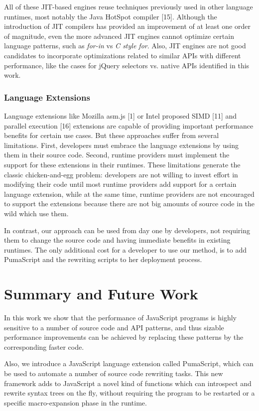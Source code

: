 \documentclass[preprint,10pt]{sigplanconf}
\begin{document}
All of these JIT-based engines reuse techniques previously used in other language runtimes, most notably the Java HotSpot compiler [15]. Although the introduction of JIT compilers has provided an improvement of at least one order of magnitude, even the more advanced JIT engines cannot optimize certain language patterns, such as \emph{for-in} vs \emph{C style for}. Also, JIT engines are not good candidates to incorporate optimizations related to similar APIs with different performance, like the cases for jQuery selectors vs. native APIs identified in this work.

\subsubsection{Language Extensions}

Language extensions like Mozilla asm.js [1] or Intel proposed SIMD [11] and parallel execution [16] extensions are capable of providing important performance benefits for certain use cases. But these approaches suffer from several limitations. First, developers must embrace the language extensions by using them in their source code. Second, runtime providers must implement the support for these extensions in their runtimes. These limitations generate the classic chicken-and-egg problem: developers are not willing to invest effort in modifying their code until most runtime providers add support for a certain language extension, while at the same time, runtime providers are not encouraged to support the extensions because there are not big amounts of source code in the wild which use them.

In contrast, our approach can be used from day one by developers, not requiring them to change the source code and having immediate benefits in existing runtimes. The only additional cost for a developer to use our method, is to add PumaScript and the rewriting scripts to her deployment process.

\section{Summary and Future Work}
In this work we show that the performance of JavaScript programs is highly sensitive to a number of source code and API patterns, and thus sizable performance improvements can be achieved by replacing these patterns by the corresponding faster code.

Also, we introduce a JavaScript language extension called PumaScript, which can be used to automate a number of source code rewriting tasks. This new framework adds to JavaScript a novel kind of functions which can introspect and rewrite syntax trees on the fly,  without requiring the program to be restarted or a specific macro-expansion phase in the runtime.
\end{document}
